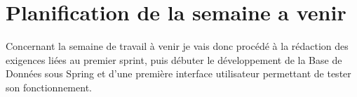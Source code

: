 \documentclass[a4paper, 12pt]{article}
\begin{document}
    \section{Planification de la semaine a venir}
    Concernant la semaine de travail à venir je vais donc procédé à la rédaction des exigences liées au premier sprint, puis débuter le développement de la Base de Données sous Spring et d'une première interface utilisateur permettant de tester son fonctionnement.
\end{document}
